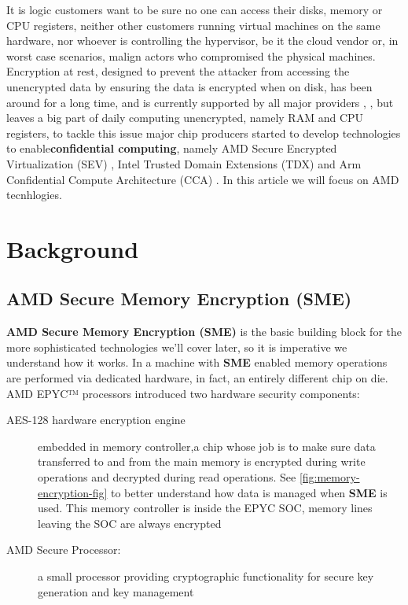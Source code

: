 \documentclass[twocolumn]{article}
\begin{document}
It is logic customers want to be sure no one can access their disks, memory or CPU registers, neither other customers running virtual machines on the same hardware, nor whoever is controlling the hypervisor, be it  the cloud vendor  or, in worst case scenarios, malign actors who compromised the physical machines. Encryption at rest, designed to prevent the attacker from accessing the unencrypted data by ensuring the data is encrypted when on disk, has been around for a long time, and is currently supported by all major providers \cite{aws-enc}, \cite{gcp-enc}, \cite{azure-enc} but leaves a big part of daily computing unencrypted, namely RAM and CPU registers, to tackle this issue major chip producers started to develop technologies to enable\textbf{confidential computing}, namely AMD Secure Encrypted Virtualization (SEV) \cite{memory-encryption}, Intel Trusted Domain Extensions (TDX) \cite{tdx} and Arm Confidential Compute Architecture (CCA) \cite{cca}. In this article we will focus on AMD tecnhlogies.

\section{Background}
\subsection{AMD Secure Memory Encryption (SME)}

\textbf{AMD Secure Memory Encryption (SME)} is the basic building block for the more sophisticated technologies we'll cover later, so it is imperative we understand how it works. In a machine with \textbf{SME} enabled memory operations are performed via dedicated hardware, in fact, an entirely different chip on die. AMD EPYC™ processors introduced two hardware security components:

\begin{description}
    \item [AES-128 hardware encryption engine] embedded in memory controller,a chip whose job is to make sure data transferred to and from the main memory is encrypted during write operations and decrypted during read operations. See \ref{fig:memory-encryption-fig} to better understand how data is managed when \textbf{SME} is used. This memory controller is inside the EPYC SOC, memory lines leaving the SOC are always encrypted
    \item [AMD Secure Processor:] a small processor providing cryptographic functionality for secure key generation and key management
\end{description}
\end{document}
